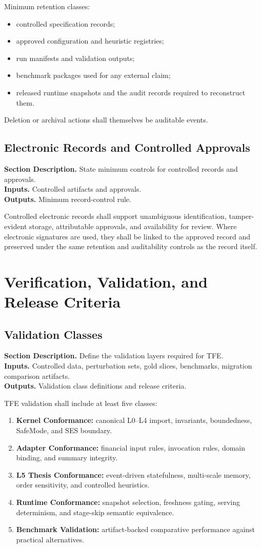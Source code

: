 \documentclass[11pt]{report}
\newcommand{\meta}[3]{\textbf{Section Description.} #1\\
\textbf{Inputs.} #2\\
\textbf{Outputs.} #3\par}
\begin{document}
Minimum retention classes:
\begin{itemize}
\item controlled specification records;
\item approved configuration and heuristic registries;
\item run manifests and validation outputs;
\item benchmark packages used for any external claim;
\item released runtime snapshots and the audit records required to reconstruct them.
\end{itemize}

Deletion or archival actions shall themselves be auditable events.

\section{Electronic Records and Controlled Approvals}
\meta{State minimum controls for controlled records and approvals.}{Controlled artifacts and approvals.}{Minimum record-control rule.}

Controlled electronic records shall support unambiguous identification, tamper-evident storage, attributable approvals, and availability for review. Where electronic signatures are used, they shall be linked to the approved record and preserved under the same retention and auditability controls as the record itself.

\chapter{Verification, Validation, and Release Criteria}
\section{Validation Classes}
\meta{Define the validation layers required for TFE.}{Controlled data, perturbation sets, gold slices, benchmarks, migration comparison artifacts.}{Validation class definitions and release criteria.}

TFE validation shall include at least five classes:
\begin{enumerate}[leftmargin=1.2cm]
    \item \textbf{Kernel Conformance:} canonical L0--L4 import, invariants, boundedness, SafeMode, and SES boundary.
    \item \textbf{Adapter Conformance:} financial input rules, invocation rules, domain binding, and summary integrity.
    \item \textbf{L5 Thesis Conformance:} event-driven statefulness, multi-scale memory, order sensitivity, and controlled heuristics.
    \item \textbf{Runtime Conformance:} snapshot selection, freshness gating, serving determinism, and stage-skip semantic equivalence.
    \item \textbf{Benchmark Validation:} artifact-backed comparative performance against practical alternatives.
\end{enumerate}
\end{document}
